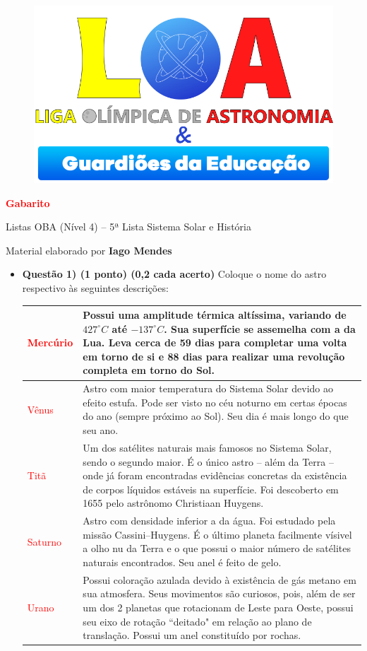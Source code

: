 \documentclass[a4paper, 12pt]{article}
\newcommand{\red}[1]{\textcolor{red}{#1}}
\newcommand{\cabecalho}[4]
{
	\begin{figure}
		\centering
		\href{https://ligaolimpicadeastronomia.com.br/}{\includegraphics[scale=0.6]{./img/logos.png}}
	\end{figure}
	
	\begin{center}
		\begin{large}
			\textbf{#1}	
		\end{large}
			\linebreak Listas OBA (Nível 4) -- #2ª Lista
			\linebreak #3
		\end{center}
	
	\begin{flushright}
		Material elaborado por \textbf{#4}
	\end{flushright}
}
\begin{document}
	\cabecalho{\red{Gabarito}}{5}{Sistema Solar e História}{Iago Mendes}
	
	\begin{flushleft}
	\begin{itemize}
		\item \textbf{Questão 1) (1 ponto) (0,2 cada acerto)} Coloque o nome do astro respectivo às seguintes descrições:
			\begin{center} \begin{tabular}{|M{0.2\textwidth}|M{0.65\textwidth}|}
				\hline
				\red{Mercúrio} & Possui uma amplitude térmica altíssima, variando de $427^{\circ}C$ até $-137^{\circ}C$. Sua superfície se assemelha com a da Lua. Leva cerca de 59 dias para completar uma volta em torno de si e 88 dias para realizar uma revolução completa em torno do Sol. \\ \hline
				\red{Vênus} & Astro com maior temperatura do Sistema Solar devido ao efeito estufa. Pode ser visto no céu noturno em certas épocas do ano (sempre próximo ao Sol). Seu dia é mais longo do que seu ano. \\ \hline
				\red{Titã} & Um dos satélites naturais mais famosos no Sistema Solar, sendo o segundo maior. É o único astro -- além da Terra -- onde já foram encontradas evidências concretas da existência de corpos líquidos estáveis na superfície. Foi descoberto em 1655 pelo astrônomo Christiaan Huygens. \\ \hline
				\red{Saturno} & Astro com densidade inferior a da água. Foi estudado pela missão Cassini–Huygens. É o último planeta facilmente vísivel a olho nu da Terra e o que possui o maior número de satélites naturais encontrados. Seu anel é feito de gelo. \\ \hline
				\red{Urano} & Possui coloração azulada devido à existência de gás metano em sua atmosfera. Seus movimentos são curiosos, pois, além de ser um dos 2 planetas que rotacionam de Leste para Oeste, possui seu eixo de rotação ``deitado" em relação ao plano de translação. Possui um anel constituído por rochas.\\ \hline
			\end{tabular} \end{center}
		

\end{itemize}
\end{flushleft}
\end{document}
